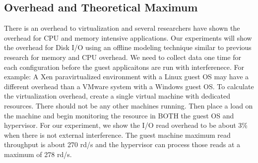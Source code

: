 \subsection{Overhead and Theoretical Maximum}
There is an overhead to virtualization and several researchers \cite{cherkasova, huber1} have shown the overhead for CPU and memory intensive applications.  Our experiments will show the overhead for Disk I/O using an offline modeling technique similar to previous research for memory and CPU overhead.  We need to collect data one time for each configuration before the guest applicaitons are run with interferenece. For example: A Xen paravirtualized environment with a Linux guest OS may have a different overhead than a VMware system with a Windows guest OS.  
\newline
To calculate the virtualization overhead, create a single virtual machine with dedicated resources.  There should not be any other machines running.  Then place a load on the machine and begin monitoring the resource in BOTH the guest OS and hypervisor.  For our experiment, we show the I/O read overhead to be about 3\% when there is not external interference.  The guest machine maximum read throughput is about 270 rd/s and the hypervisor can process those reads at a maximum of 278 rd/s.

